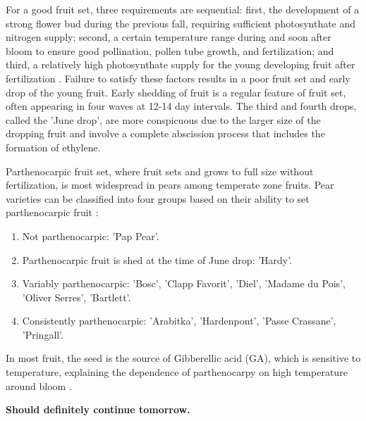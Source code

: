 \vspace{0.5em}
For a good fruit set, three requirements are sequential: first, the development of a strong flower bud during the previous fall, requiring sufficient photosynthate and nitrogen supply; second, a certain temperature range during and soon after bloom to ensure good pollination, pollen tube growth, and fertilization; and third, a relatively high photosynthate supply for the young developing fruit after fertilization \cite*{rmb_01_physiology_temperate_zone_fruit_trees}. Failure to satisfy these factors results in a poor fruit set and early drop of the young fruit. Early shedding of fruit is a regular feature of fruit set, often appearing in four waves at 12-14 day intervals. The third and fourth drops, called the 'June drop', are more conspicuous due to the larger size of the dropping fruit and involve a complete abscission process that includes the formation of ethylene.

\vspace{0.5em}
Parthenocarpic fruit set, where fruit sets and grows to full size without fertilization, is most widespread in pears among temperate zone fruits. Pear varieties can be classified into four groups based on their ability to set parthenocarpic fruit \cite*{rmb_01_physiology_temperate_zone_fruit_trees}: 

\begin{enumerate} 
    \item Not parthenocarpic: 'Pap Pear'. 
    \item Parthenocarpic fruit is shed at the time of June drop: 'Hardy'. 
    \item Variably parthenocarpic: 'Bosc', 'Clapp Favorit', 'Diel', 'Madame du Pois', 'Oliver Serres', 'Bartlett'. 
    \item Consistently parthenocarpic: 'Arabitka', 'Hardenpont', 'Passe Crassane', 'Pringall'. 
\end{enumerate} 

\vspace{0.5em}
In most fruit, the seed is the source of Gibberellic acid (GA), which is sensitive to temperature, explaining the dependence of parthenocarpy on high temperature around bloom \cite*{rmb_01_physiology_temperate_zone_fruit_trees}.



\textbf{Should definitely continue tomorrow.}


